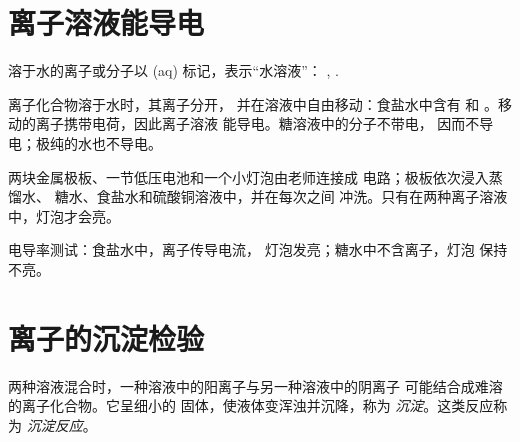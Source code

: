 \section{离子溶液能导电}

\begin{notation}[状态符号 (aq)]\label{not:g9:ions:aq}
溶于水的离子或分子以 (aq) 标记，表示“水溶液”：
, .
\end{notation}

\begin{proposition}[离子溶液能导电]\label{prop:g9:ions:conduct}
离子化合物溶于水时，其离子分开，
并在溶液中自由移动：食盐水中含有  和
。移动的离子携带电荷，因此离子溶液
能导电。糖溶液中的分子不带电，
因而不导电；极纯的水也不导电。
\end{proposition}

\begin{inthelab}[哪些液体能导电？]
两块金属极板、一节低压电池和一个小灯泡由老师连接成
电路；极板依次浸入蒸馏水、
糖水、食盐水和硫酸铜溶液中，并在每次之间
冲洗。只有在两种离子溶液中，灯泡才会亮。
\end{inthelab}

\begin{omfigure}

{\small 电导率测试：食盐水中，离子传导电流，
灯泡发亮；糖水中不含离子，灯泡
保持不亮。}
\end{omfigure}

\section{离子的沉淀检验}

\begin{definition}[沉淀]\label{def:g9:ions:precipitate}
两种溶液混合时，一种溶液中的阳离子与另一种溶液中的阴离子
可能结合成难溶的离子化合物。它呈细小的
固体，使液体变浑浊并沉降，称为
\emph{沉淀}。这类反应称为
\emph{沉淀反应}。
\end{definition}

